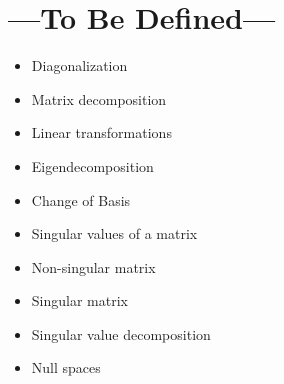 
\chapter{---To Be Defined---}\label{tbd}
\begin{itemize}
  \item Diagonalization
  \item Matrix decomposition
  \item Linear transformations
  \item Eigendecomposition
  \item Change of Basis
  \item Singular values of a matrix
  \item Non-singular matrix
  \item Singular matrix
  \item Singular value decomposition
  \item Null spaces
\end{itemize}